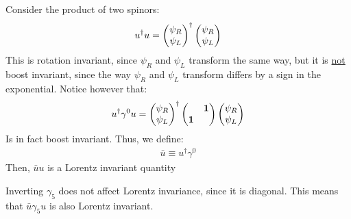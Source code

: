 Consider the product of two spinors:
\begin{align*}
  u^\dag u=\pmqty{\psi_R\\\psi_L}^\dag\pmqty{\psi_R\\\psi_L}
\end{align*}
This is rotation invariant, since $\psi_R$ and $\psi_L$ transform the same way, but it is \underline{not} boost invariant, since the way $\psi_R$ and $\psi_L$ transform differs by a sign in the exponential. Notice however that:
\begin{align*}
  u^\dag\gamma^0u=\pmqty{\psi_R\\\psi_L}^\dag
  \pmqty{&\bm{1}\\\bm{1}}
  \pmqty{\psi_R\\\psi_L}
\end{align*}
Is in fact boost invariant. Thus, we define:
\begin{align*}
  \bar{u}\equiv u^\dag\gamma^0
\end{align*}
Then, $\bar{u}u$ is a Lorentz invariant quantity

Inverting $\gamma_5$ does not affect Lorentz invariance, since it is diagonal. This means that $\bar{u}\gamma_5 u$ is also Lorentz invariant.

